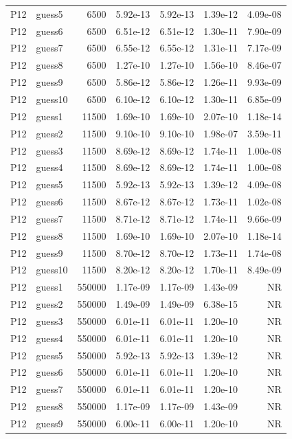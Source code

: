 {\begin{longtable}{llrrrrr}
P12 & guess5 & 6500 & 5.92e-13 & 5.92e-13 & 1.39e-12 & 4.09e-08 \\
P12 & guess6 & 6500 & 6.51e-12 & 6.51e-12 & 1.30e-11 & 7.90e-09 \\
P12 & guess7 & 6500 & 6.55e-12 & 6.55e-12 & 1.31e-11 & 7.17e-09 \\
P12 & guess8 & 6500 & 1.27e-10 & 1.27e-10 & 1.56e-10 & 8.46e-07 \\
P12 & guess9 & 6500 & 5.86e-12 & 5.86e-12 & 1.26e-11 & 9.93e-09 \\
P12 & guess10 & 6500 & 6.10e-12 & 6.10e-12 & 1.30e-11 & 6.85e-09 \\
P12 & guess1 & 11500 & 1.69e-10 & 1.69e-10 & 2.07e-10 & 1.18e-14 \\
P12 & guess2 & 11500 & 9.10e-10 & 9.10e-10 & 1.98e-07 & 3.59e-11 \\
P12 & guess3 & 11500 & 8.69e-12 & 8.69e-12 & 1.74e-11 & 1.00e-08 \\
P12 & guess4 & 11500 & 8.69e-12 & 8.69e-12 & 1.74e-11 & 1.00e-08 \\
P12 & guess5 & 11500 & 5.92e-13 & 5.92e-13 & 1.39e-12 & 4.09e-08 \\
P12 & guess6 & 11500 & 8.67e-12 & 8.67e-12 & 1.73e-11 & 1.02e-08 \\
P12 & guess7 & 11500 & 8.71e-12 & 8.71e-12 & 1.74e-11 & 9.66e-09 \\
P12 & guess8 & 11500 & 1.69e-10 & 1.69e-10 & 2.07e-10 & 1.18e-14 \\
P12 & guess9 & 11500 & 8.70e-12 & 8.70e-12 & 1.73e-11 & 1.74e-08 \\
P12 & guess10 & 11500 & 8.20e-12 & 8.20e-12 & 1.70e-11 & 8.49e-09 \\
P12 & guess1 & 550000 & 1.17e-09 & 1.17e-09 & 1.43e-09 & NR \\
P12 & guess2 & 550000 & 1.49e-09 & 1.49e-09 & 6.38e-15 & NR \\
P12 & guess3 & 550000 & 6.01e-11 & 6.01e-11 & 1.20e-10 & NR \\
P12 & guess4 & 550000 & 6.01e-11 & 6.01e-11 & 1.20e-10 & NR \\
P12 & guess5 & 550000 & 5.92e-13 & 5.92e-13 & 1.39e-12 & NR \\
P12 & guess6 & 550000 & 6.01e-11 & 6.01e-11 & 1.20e-10 & NR \\
P12 & guess7 & 550000 & 6.01e-11 & 6.01e-11 & 1.20e-10 & NR \\
P12 & guess8 & 550000 & 1.17e-09 & 1.17e-09 & 1.43e-09 & NR \\
P12 & guess9 & 550000 & 6.00e-11 & 6.00e-11 & 1.20e-10 & NR \\

\end{longtable}}

